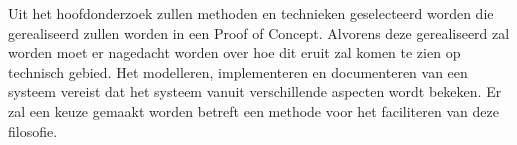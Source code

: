 Uit het hoofdonderzoek zullen methoden en technieken geselecteerd worden die gerealiseerd zullen worden in een Proof of Concept. Alvorens deze gerealiseerd zal worden moet er nagedacht worden over hoe dit eruit zal komen te zien op technisch gebied. Het modelleren, implementeren en documenteren van een systeem vereist dat het systeem vanuit verschillende aspecten wordt bekeken. Er zal een keuze gemaakt worden betreft een methode voor het faciliteren van deze filosofie.
